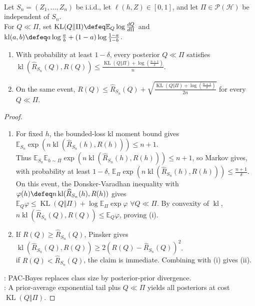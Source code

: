 \begin{theorem} \label{thm:sl-pac-bayes-kl-form} \\
Let $S_n=(Z_1,\ldots,Z_n)$ be i.i.d., let $\ell(h,Z)\in[0,1]$, and let $\Pi\in\mathcal{P}(\mathcal{H})$ be independent of $S_n$.\\
For $Q\ll\Pi$, set $\operatorname{KL}(Q\Vert\Pi)\defeq\mathbb{E}_Q\log\frac{dQ}{d\Pi}$ and $\operatorname{kl}(a,b)\defeq a\log\frac{a}{b}+(1-a)\log\frac{1-a}{1-b}$.
\begin{enumerate}[label=(\roman*)]
\setlength{\itemsep}{0pt}
\item With probability at least $1-\delta$, every posterior $Q\ll\Pi$ satisfies $\operatorname{kl}(\widehat{R}_{S_n}(Q),R(Q))\leq\frac{\operatorname{KL}(Q\Vert\Pi)+\log\left(\frac{n+1}{\delta}\right)}{n}$.
\item On the same event, $R(Q)\leq\widehat{R}_{S_n}(Q)+\sqrt{\frac{\operatorname{KL}(Q\Vert\Pi)+\log\left(\frac{n+1}{\delta}\right)}{2n}}$ for every $Q\ll\Pi$.
\end{enumerate}
\begin{proof}
\begin{enumerate}[label=(\roman*)]
\setlength{\itemsep}{0pt}
\item For fixed $h$, the bounded-loss kl moment bound gives $\mathbb{E}_{S_n}\exp(n\operatorname{kl}(\widehat{R}_{S_n}(h),R(h)))\leq n+1$.\\
Thus $\mathbb{E}_{S_n}\mathbb{E}_{h\sim\Pi}\exp(n\operatorname{kl}(\widehat{R}_{S_n}(h),R(h)))\leq n+1$, so Markov gives,\\
with probability at least $1-\delta$, $\mathbb{E}_{\Pi}\exp(n\operatorname{kl}(\widehat{R}_{S_n}(h),R(h)))\leq\frac{n+1}{\delta}$.\\
On this event, the Donsker-Varadhan inequality with $\varphi(h)\defeq n\operatorname{kl}(\widehat{R}_{S_n}(h),R(h))$ gives\\
$\mathbb{E}_Q\varphi\leq\operatorname{KL}(Q\Vert\Pi)+\log\mathbb{E}_{\Pi}\exp\varphi$  $\forall Q\ll\Pi$. By convexity of $\operatorname{kl}$, $n\operatorname{kl}(\widehat{R}_{S_n}(Q),R(Q))\leq\mathbb{E}_Q\varphi$, proving (i).
\item If $R(Q)\geq\widehat{R}_{S_n}(Q)$, Pinsker gives $\operatorname{kl}(\widehat{R}_{S_n}(Q),R(Q))\geq2(R(Q)-\widehat{R}_{S_n}(Q))^2$.\\
if $R(Q)<\widehat{R}_{S_n}(Q)$, the claim is immediate. Combining with (i) gives (ii).
\end{enumerate}
: PAC-Bayes replaces class size by posterior-prior divergence.\\
: A prior-average exponential tail plus $Q\ll\Pi$ yields all posteriors at cost $\operatorname{KL}(Q\Vert\Pi)$.
\end{proof}
\end{theorem}

